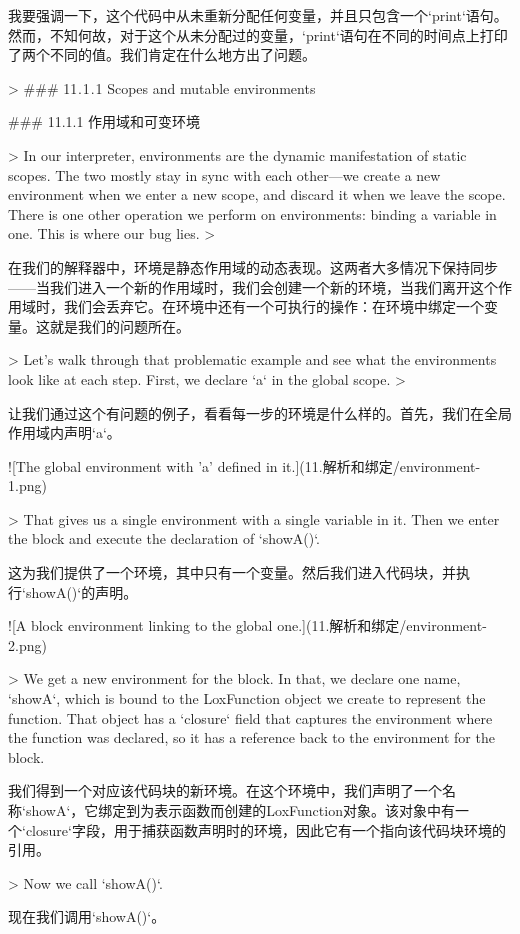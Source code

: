 \documentclass[cn,11pt,chinese]{elegantbook}
\begin{document}
{{{{{{{{{{{{我要强调一下，这个代码中从未重新分配任何变量，并且只包含一个`print`语句。然而，不知何故，对于这个从未分配过的变量，`print`语句在不同的时间点上打印了两个不同的值。我们肯定在什么地方出了问题。

> ### 11 . 1 . 1 Scopes and mutable environments

### 11.1.1 作用域和可变环境

> In our interpreter, environments are the dynamic manifestation of static scopes. The two mostly stay in sync with each other—we create a new environment when we enter a new scope, and discard it when we leave the scope. There is one other operation we perform on environments: binding a variable in one. This is where our bug lies.
>

在我们的解释器中，环境是静态作用域的动态表现。这两者大多情况下保持同步——当我们进入一个新的作用域时，我们会创建一个新的环境，当我们离开这个作用域时，我们会丢弃它。在环境中还有一个可执行的操作：在环境中绑定一个变量。这就是我们的问题所在。

> Let’s walk through that problematic example and see what the environments look like at each step. First, we declare `a` in the global scope.
>

让我们通过这个有问题的例子，看看每一步的环境是什么样的。首先，我们在全局作用域内声明`a`。

![The global environment with 'a' defined in it.](11.解析和绑定/environment-1.png)

> That gives us a single environment with a single variable in it. Then we enter the block and execute the declaration of `showA()`.

这为我们提供了一个环境，其中只有一个变量。然后我们进入代码块，并执行`showA()`的声明。

![A block environment linking to the global one.](11.解析和绑定/environment-2.png)

> We get a new environment for the block. In that, we declare one name, `showA`, which is bound to the LoxFunction object we create to represent the function. That object has a `closure` field that captures the environment where the function was declared, so it has a reference back to the environment for the block.

我们得到一个对应该代码块的新环境。在这个环境中，我们声明了一个名称`showA`，它绑定到为表示函数而创建的LoxFunction对象。该对象中有一个`closure`字段，用于捕获函数声明时的环境，因此它有一个指向该代码块环境的引用。

> Now we call `showA()`.

现在我们调用`showA()`。

}}}}}}}}}}}}
\end{document}
